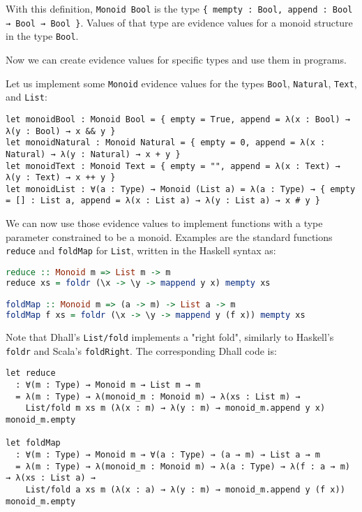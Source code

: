 With this definition, \lstinline!Monoid Bool! is the type \lstinline!{ mempty : Bool, append : Bool → Bool → Bool }!.
Values of that type are evidence values for a monoid structure in the type \lstinline!Bool!.


Now we can create evidence values for specific types and use them in programs.


Let us implement some \lstinline!Monoid! evidence values for the types \lstinline!Bool!, \lstinline!Natural!, \lstinline!Text!, and \lstinline!List!:


\begin{lstlisting}[language=Dhall]
let monoidBool : Monoid Bool = { empty = True, append = λ(x : Bool) → λ(y : Bool) → x && y }
let monoidNatural : Monoid Natural = { empty = 0, append = λ(x : Natural) → λ(y : Natural) → x + y }
let monoidText : Monoid Text = { empty = "", append = λ(x : Text) → λ(y : Text) → x ++ y }
let monoidList : ∀(a : Type) → Monoid (List a) = λ(a : Type) → { empty = [] : List a, append = λ(x : List a) → λ(y : List a) → x # y }
\end{lstlisting}


We can now use those evidence values to implement functions with a type parameter constrained to be a monoid.
Examples are the standard functions \lstinline!reduce! and \lstinline!foldMap! for \lstinline!List!, written in the Haskell syntax as:


\begin{lstlisting}[language=Haskell]
reduce :: Monoid m => List m -> m
reduce xs = foldr (\x -> \y -> mappend y x) mempty xs

foldMap :: Monoid m => (a -> m) -> List a -> m
foldMap f xs = foldr (\x -> \y -> mappend y (f x)) mempty xs
\end{lstlisting}


Note that Dhall's \lstinline!List/fold! implements a "right fold", similarly to Haskell's \lstinline!foldr! and Scala's \lstinline!foldRight!.
The corresponding Dhall code is:


\begin{lstlisting}[language=Dhall]
let reduce
  : ∀(m : Type) → Monoid m → List m → m
  = λ(m : Type) → λ(monoid_m : Monoid m) → λ(xs : List m) →
    List/fold m xs m (λ(x : m) → λ(y : m) → monoid_m.append y x) monoid_m.empty

let foldMap
  : ∀(m : Type) → Monoid m → ∀(a : Type) → (a → m) → List a → m
  = λ(m : Type) → λ(monoid_m : Monoid m) → λ(a : Type) → λ(f : a → m) → λ(xs : List a) →
    List/fold a xs m (λ(x : a) → λ(y : m) → monoid_m.append y (f x)) monoid_m.empty
\end{lstlisting}


